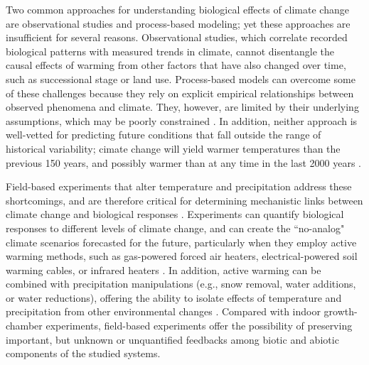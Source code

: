 \documentclass{article}
\begin{document}
\par Two common approaches for understanding biological effects of climate change are observational studies and process-based modeling; yet these approaches are insufficient for several reasons. Observational studies, which correlate recorded biological patterns with measured trends in climate, cannot disentangle the causal effects of warming from other factors that have also changed over time, such as successional stage or land use. Process-based models can overcome some of these challenges because they rely on explicit empirical relationships between observed phenomena and climate. They, however, are limited by their underlying assumptions, which may be poorly constrained \citep [e.g.,][]{pearson2004,ibanez2006,swab2012,chuine2016}. In addition, neither approach is well-vetted for predicting future conditions that fall outside the range of historical variability; cimate change will yield warmer temperatures than the previous 150 years, and possibly warmer than at any time in the last 2000 years \citep{ohlemuller2006,williams2007,williams2007b,ipcc2013}.  

\par Field-based experiments that alter temperature and precipitation address these shortcomings, and are therefore critical for determining mechanistic links between climate change and biological responses \citep[e.g.,][]{box1978,williams2007,gelman2014}. Experiments can quantify biological responses to different levels of climate change, and can create the ``no-analog" climate scenarios forecasted for the future, particularly when they employ active warming methods, such as gas-powered forced air heaters, electrical-powered soil warming cables, or infrared heaters \citep{shaver2000,williams2007b,aronson2009}. In addition, active warming can be combined with precipitation manipulations (e.g., snow removal, water additions, or water reductions), offering the ability to isolate effects of temperature and precipitation from other environmental changes \citep [e.g.,][]{price1998,cleland2006,sherry2007,rollinson2012}. %
Compared with indoor growth-chamber experiments, field-based experiments offer the possibility of preserving important, but unknown or unquantified feedbacks among biotic and abiotic components of the studied systems. 
\end{document}
